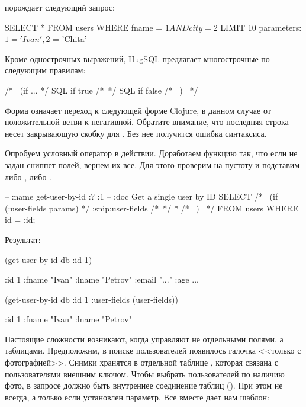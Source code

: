 \noindent
порождает следующий запрос:

\begin{english}
  \begin{sql}
SELECT * FROM users
WHERE fname = $1
  AND city = $2
LIMIT 10
parameters: $1 = 'Ivan', $2 = 'Chita'
  \end{sql}
\end{english}

Кроме однострочных выражений, HugSQL предлагает многострочные по следующим правилам:

\begin{english}
  \begin{sql}
/*~ (if ... */
SQL if true
/*~*/
SQL if false
/*~ ) ~*/
  \end{sql}
\end{english}

Форма \code{/*{}\~{}*/} означает переход к следующей форме Clojure, в данном случае от положительной ветви  к негативной. Обратите внимание, что последняя строка несет закрывающую скобку для . Без нее получится ошибка синтаксиса.

Опробуем условный оператор в действии. Доработаем функцию  так, что если не задан сниппет полей, вернем их все. Для этого проверим  на пустоту и подставим либо , либо \code{*}.

\begin{english}
  \begin{sql}
-- :name get-user-by-id :? :1
-- :doc Get a single user by ID
SELECT
/*~ (if (:user-fields params) */
:snip:user-fields
/*~*/
*
/*~ ) ~*/
FROM users
WHERE id = :id;
  \end{sql}
\end{english}

Результат:

\begin{english}
  \begin{clojure}
(get-user-by-id db {:id 1})

{:id 1
 :fname "Ivan"
 :lname "Petrov"
 :email "..."
 :age ...}

(get-user-by-id db {:id 1 :user-fields (user-fields)})

{:id 1
 :fname "Ivan"
 :lname "Petrov"}
  \end{clojure}
\end{english}

Настоящие сложности возникают, когда управляют не отдельными полями, а таблицами. Предположим, в поиске пользователей появилось галочка <<только с фотографией>>. Снимки хранятся в отдельной таблице , которая связана с пользователями внешним ключом. Чтобы выбрать пользователей по наличию фото, в запросе должно быть внутреннее соединение таблиц (). При этом не всегда, а только если установлен параметр. Все вместе дает нам шаблон:

